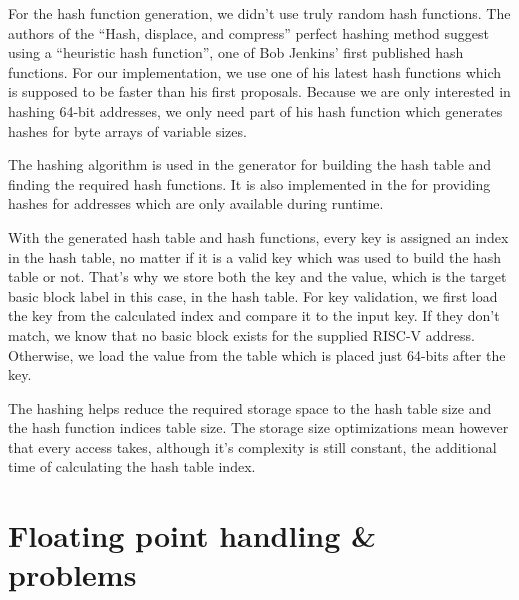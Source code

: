 \documentclass[course=eragp]{aspdoc}
\begin{document}
\begin{enumerate}
\par

For the hash function generation, we didn't use truly random hash functions. The authors of the ``Hash,
displace, and compress'' perfect hashing method suggest using a ``heuristic hash
function''\cite{CHD}, one of Bob Jenkins' first published hash functions.\cite{jenkins_hash_1} For
our implementation, we use one of his latest hash functions which is supposed to be faster than his
first proposals.\cite{jenkins_hash_2} Because we are only interested in hashing 64-bit addresses, we
only need part of his hash function which generates hashes for byte arrays of variable sizes. 

\par

The hashing algorithm is used in the generator for building the hash table and finding the required
hash functions. It is also implemented in the  for providing hashes for addresses
which are only available during runtime. 

\par 

With the generated hash table and hash functions, every key is assigned an index in the hash table,
no matter if it is a valid key which was used to build the hash table or not. That's why we store
both the key and the value, which is the target basic block label in this case, in the hash table.
For key validation, we first load the key from the calculated index and compare it to the input key.
If they don't match, we know that no basic block exists for the supplied RISC-V address. Otherwise,
we load the value from the table which is placed just 64-bits after the key.

\par

The hashing helps reduce the required storage space to the hash table size and the hash function
indices table size. The storage size optimizations mean however that
every access takes, although it's complexity is still constant, the additional time of calculating
the hash table index.

\end{enumerate}


\section{Floating point handling \& problems}
\end{document}
